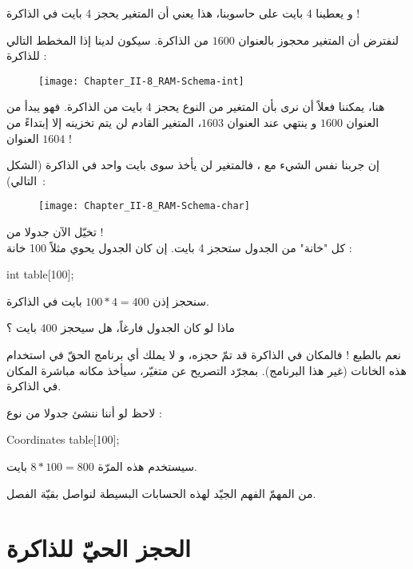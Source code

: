 و
يعطينا 4 بايت على حاسوبنا، هذا يعني أن المتغير يحجز 4 بايت في الذاكرة !

لنفترض أن المتغير
محجوز بالعنوان
$1600$
من الذاكرة. سيكون لدينا إذا المخطط التالي للذاكرة :

\begin{figure}[H]
	\centering
	\texttt{[image: Chapter\_II-8\_RAM-Schema-int]}
\end{figure}

هنا، يمكننا فعلاً أن نرى بأن المتغير
من النوع
يحجز 4 بايت من الذاكرة.
فهو يبدأ من العنوان
$1600$
و ينتهي عند العنوان
$1603$،
المتغير القادم لن يتم تخزينه إلا إبتداءً من العنوان
$1604$ !

إن جربنا نفس الشيء مع
،
فالمتغير لن يأخذ سوى بايت واحد في الذاكرة (الشكل التالي)~:

\begin{figure}[H]
	\centering
	\texttt{[image: Chapter\_II-8\_RAM-Schema-char]}
\end{figure}

تخيّل الآن جدولا من
 !\\
كل "خانة" من الجدول ستحجز 4 بايت. إن كان الجدول يحوي مثلاً  100 خانة :

\begin{Csource}
int table[100];
\end{Csource}

سنحجز إذن
$100 * 4 = 400$
بايت في الذاكرة.

\begin{question}
ماذا لو كان الجدول فارغاً، هل سيحجز 400 بايت ؟
\end{question}

نعم بالطبع ! فالمكان  في الذاكرة قد تمّ حجزه، و لا يملك أي برنامج الحقّ في استخدام هذه الخانات (غير هذا البرنامج). بمجرّد التصريح عن متغيّر، سيأخذ مكانه مباشرة المكان في الذاكرة.

لاحظ لو أننا ننشئ جدولا من نوع
 :

\begin{Csource}
Coordinates table[100];
\end{Csource}

سيستخدم هذه المرّة
$8 * 100 = 800$
بايت.

من المهمّ الفهم الجيّد لهذه الحسابات البسيطة لنواصل بقيّة الفصل.

\section{الحجز الحيّ للذاكرة}

